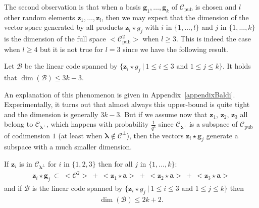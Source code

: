 \documentclass[runningheads,11pt]{llncs}
\newcommand{\code}[1]{\ensuremath{\mathscr{#1}}}
\newcommand{\Cpub}{\code{C}_{\text{pub}}}
\newcommand{\CC}{\code{C}}
\newcommand{\sqc}[1]{<#1^2>}
\newcommand{\cwp}{\star}
\newcommand{\word}[1]{\ensuremath{\boldsymbol{#1}}}
\newcommand{\av}{\word{a}}
\newcommand{\lambdav}{\word{\lambda}}
\newcommand{\gv}{\word{g}}
\newcommand{\zv}{\word{z}}
\begin{document}
The second observation is that when a basis 
$\gv_1,\dots,\gv_k$ of $\Cpub$ is chosen and $l$ other random elements $\zv_1,\dots,\zv_l$, then we may expect that 
the dimension of the vector space generated by all products $\zv_i \cwp g_j$ with $i$ in $\{1,\dots,l\}$ and $j$ in 
$\{1,\dots,k\}$ is the dimension of the full space $\sqc{\Cpub}$ when
$l \geqslant 3$. This is indeed the case when $l \geqslant 4$ 
but it is not true for $l=3$ since we have the following result.
\begin{proposition}\label{prop:three} Let $\code{B}$ be the linear code spanned by $\big
  \{ \zv_i \cwp g_j ~|~ 1 \leqslant i \leqslant 3 \text{~and~} 1 \leqslant j
  \leqslant k \big \}$. It holds that
$\dim \left ( \code{B}   \right ) \leqslant 3k-3.$
\end{proposition}
An explanation of this phenomenon is given in Appendix~\ref{appendixBaldi}. Experimentally, it turns out that almost always this upper-bound
is quite tight and the dimension is generally $3k-3$. But if we assume
now that $\zv_1$, $\zv_2$, $\zv_3$ all belong to
$\CC_{\lambdav^\perp}$, which happens with probability $\frac{1}{q^3}$ since $\CC_{\lambdav^\perp}$ is 
a subspace of $\Cpub$ of codimension $1$ (at least when $\lambdav \notin \CC^\perp$),
then the vectors $\zv_i \cwp \gv_j$ generate a subspace with  a much
smaller dimension.
\begin{proposition}\label{prop:attack}
If $\zv_i$ is in $\CC_{\lambdav^\perp}$ for $i$ in $\{1,2,3\}$
then for all $j$ in 
$\{1,\dots,k\}$:
\begin{eqnarray}
 \zv_i \cwp \gv_j    ~\subset~  \sqc{\CC} ~+~ <\zv_1 \cwp \av> ~+~
<\zv_2 \cwp \av> ~+~ <\zv_3 \cwp \av> \label{eq:idea}
\end{eqnarray}
and if $\code{B}$ is the linear code spanned by $\big
  \{ \zv_i \cwp g_j ~|~ 1 \leqslant i \leqslant 3 \text{~and~} 1 \leqslant j
  \leqslant k \big \}$ then
\begin{eqnarray}
 \dim \left( \code{B} \right ) \leqslant 2k+2.  \label{eq:consequence}
\end{eqnarray}
\end{proposition}
\end{document}
